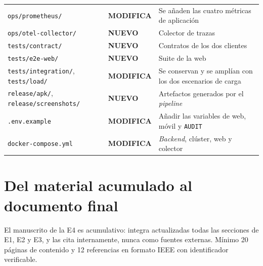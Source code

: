 \documentclass[11pt,a4paper]{article}
\newcommand{\cambia}{\cellcolor{filaCambia}\textbf{MODIFICA}}
\newcommand{\nuevo}{\cellcolor{filaNuevo}\textbf{NUEVO}}
\begin{document}
\begin{center}
\begin{longtable}{@{}p{5.4cm}p{1.9cm}p{7.5cm}@{}}
		\texttt{ops/prometheus/} & \cambia & Se añaden las cuatro métricas de aplicación \\
		\texttt{ops/otel-collector/} & \nuevo & Colector de trazas \\
		\texttt{tests/contract/} & \nuevo & Contratos de los dos clientes \\
		\texttt{tests/e2e-web/} & \nuevo & Suite de la web \\
		\texttt{tests/integration/},\allowbreak{} \texttt{tests/load/} & \cambia & Se conservan y se amplían con los dos escenarios de carga \\
		\texttt{release/apk/},\allowbreak{} \texttt{release/screenshots/} & \nuevo & Artefactos generados por el \emph{pipeline} \\
		\texttt{.env.example} & \cambia & Añadir las variables de web, móvil y \texttt{AUDIT} \\
		\texttt{docker-compose.yml} & \cambia & \emph{Backend}, clúster, web y colector \\
		\bottomrule
	\end{longtable}
\end{center}

\section{Del material acumulado al documento final}

El manuscrito de la E4 es acumulativo: integra actualizadas todas las secciones de E1, E2 y E3, y las cita internamente, nunca como fuentes externas. Mínimo 20 páginas de contenido y 12 referencias en formato IEEE con identificador verificable.
\end{document}
